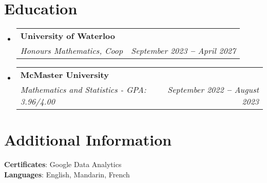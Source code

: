 \documentclass[letterpaper,11pt]{article}
\makeatletter
\newcommand{\resumeSubheading}[4]{
  \vspace{-2pt}\item
    \begin{tabular*}{0.97\textwidth}[t]{l@{\extracolsep{\fill}}r}
      \textbf{#1} \\
      \textit{\small#3} & \textit{\small #4} \\
    \end{tabular*}\vspace{-7pt}
}
\newcommand{\resumeSubHeadingListStart}{\begin{itemize}[leftmargin=0.15in, label={}]}
\newcommand{\resumeSubHeadingListEnd}{\end{itemize}}
\makeatother
\begin{document}
\section{Education}
  \resumeSubHeadingListStart
    \resumeSubheading
      {University of Waterloo}{}
      {Honours Mathematics, Coop}{September 2023 \textbf{--} April 2027}
    \resumeSubheading
      {McMaster University}{}
      {Mathematics and Statistics - GPA: 3.96/4.00}{September 2022 \textbf{--} August 2023}

  \resumeSubHeadingListEnd

\section{Additional Information}
 \begin{itemize}[leftmargin=0.15in, label={}]
    \small{\item{
     \textbf{Certificates}{: Google Data Analytics} \\
     \textbf{Languages}{: English, Mandarin, French} \\
    }}
 \end{itemize}
 
\end{document}
